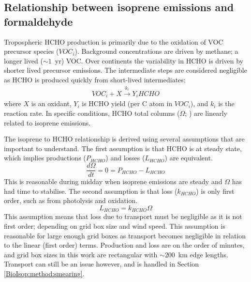     
  \subsection{Relationship between isoprene emissions and formaldehyde}
    \label{BioIsop:method:slope}
    
    
    Tropospheric HCHO production is primarily due to the oxidation of VOC precursor species ($VOC_i$).
    Background concentrations are driven by methane; a longer lived ($\sim 1$~yr) VOC.
    Over continents the variability in HCHO is driven by shorter lived precursor emissions.
    The intermediate steps are considered negligible as HCHO is produced quickly from short-lived intermediates:
    \begin{eqnarray*}
      VOC_i + X \overset{k_i}{\rightarrow} Y_i HCHO
    \end{eqnarray*}
    where $X$ is an oxidant, $Y_i$ is HCHO yield (per C atom in $VOC_i$), and $k_i$ is the reaction rate.
    In specific conditions, HCHO total columns ($\Omega$; \moleccm) are linearly related to isoprene emissions.
    
    The isoprene to HCHO relationship is derived using several assumptions that are important to understand.
    The first assumption is that HCHO is at steady state, which implies productions ($P_{HCHO}$) and losses ($L_{HCHO}$) are equivalent.
    \begin{equation}
      \label{BioIsop:method:slope:eqn_steady_state]}
      \frac{d \Omega }{dt} = 0 = P_{HCHO} - L_{HCHO}
    \end{equation}
    This is reasonable during midday when isoprene emissions are steady and $\Omega$ has had time to stabilise.
    The second assumption is that loss ($k_{HCHO}$) is only first order, such as from photolysis and oxidation.%
    \begin{equation}
      \label{BioIsop:method:slope:eqn_loss}
      L_{HCHO}  = k_{HCHO} \Omega %
    \end{equation}
    This assumption means that loss due to transport must be negligible as it is not first order; depending on grid box size and wind speed.
    This assumption is reasonable for large enough grid boxes as transport becomes negligible in relation to the linear (first order) terms.
    Production and loss are on the order of minutes, and grid box sizes in this work are rectangular with $\sim 200$~km edge lengths. 
    Transport can still be an issue however, and is handled in Section \ref{BioIsop:method:smearing}.
    
